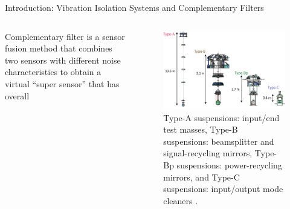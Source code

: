\documentclass{beamer}
\begin{document}
\begin{frame}[t]
\begin{columns}[t]
\begin{column}{0.32\linewidth}
\begin{block}{Introduction: Vibration Isolation Systems and Complementary Filters}
\begin{columns}[t, onlytextwidth]
\begin{column}{0.47\textwidth}
					Complementary filter is a sensor fusion method that combines two sensors with different noise characteristics to obtain a virtual ``super sensor'' that has overall 
					\end{column}
					\begin{column}{0.5\textwidth}
						\begin{figure}
							\centering
							\includegraphics[width=0.9\linewidth]{suspension_types_transparent.png}
							\caption{Type-A suspensions: input/end test masses, Type-B suspensions: beamsplitter and signal-recycling mirrors, Type-Bp suspensions: power-recycling mirrors, and Type-C suspensions: input/output mode cleaners \cite{Akutsu:2021auw}.}
							\label{fig:suspension_types}
						\end{figure}
					\end{column}
				\end{columns}
				

\end{block}
\end{column}
\end{columns}
\end{frame}
\end{document}
